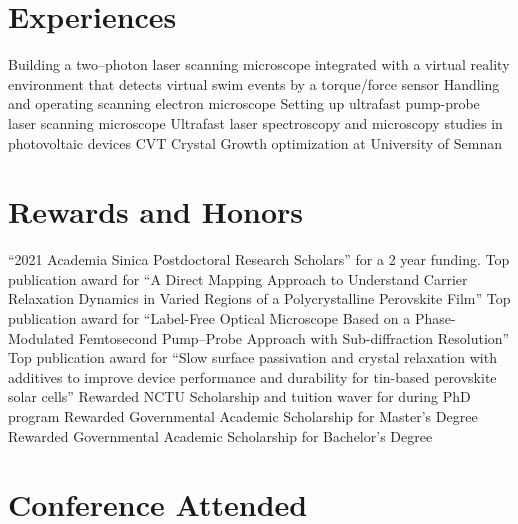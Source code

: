 \documentclass[11pt,a4paper, nolmodern]{moderncv}
\begin{document}
\section{Experiences}
		{Building a two--photon laser scanning microscope 
		integrated with a virtual reality environment 
		that detects virtual swim events by a torque/force sensor}
		{Handling and operating scanning electron microscope}
		{Setting up ultrafast pump-probe laser scanning microscope}
		{Ultrafast laser spectroscopy and microscopy
	studies in photovoltaic devices }
		{CVT Crystal Growth optimization at University of Semnan}
\section{Rewards and Honors}
		{``2021 Academia Sinica Postdoctoral 
		Research Scholars'' for a 2 year funding.}
		{Top publication award for ``A Direct Mapping 
		Approach to Understand Carrier Relaxation 
		Dynamics in Varied Regions of a 
		Polycrystalline Perovskite Film''}
		{Top publication award for ``Label-Free Optical 
		Microscope Based on a Phase-Modulated Femtosecond 
		Pump–Probe Approach with Sub-diffraction Resolution''}
		{Top publication award for ``Slow surface 
		passivation and crystal relaxation with additives to 
		improve device performance and durability for tin-based 
		perovskite solar cells''}
		{Rewarded NCTU Scholarship and tuition waver 
		for during PhD program}
		{Rewarded Governmental Academic Scholarship 
		for Master's Degree}
		{Rewarded Governmental Academic Scholarship 
		for Bachelor's Degree}
\section{Conference Attended}
\end{document}
